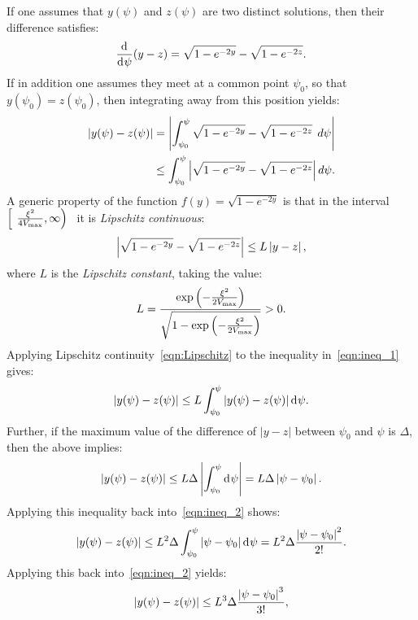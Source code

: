 If one assumes that $y(\psi)$ and $z(\psi)$ are two distinct solutions, then their difference satisfies:
%
\begin{equation}
  \frac{\operatorname{d}^{}\!{}}{\operatorname{d}^{}\!{\psi}}(y-z)
  =
  \sqrt{1-e^{-2y}} - \sqrt{1-e^{-2z}}.
  \label{eqn:master_diff}
\end{equation}
%
If in addition one assumes they meet at a common point $\psi_0$, so that $y(\psi_0)=z(\psi_0)$, then integrating away from this position yields:
%
\begin{align}
  \left|y(\psi)-z(\psi)\right|
  &=
  \left|\int_{\psi_0}^\psi \sqrt{1-e^{-2y}}
  - \sqrt{1-e^{-2z}}\:\:d\psi\right|
  \nonumber\\
  &
  \le \int_{\psi_0}^\psi \left|\sqrt{1-e^{-2y}}
  - \sqrt{1-e^{-2z}}\right|d\psi.
  \label{eqn:ineq_1}
\end{align}
%
A generic property of the function $f(y)=\sqrt{1-e^{-2y}}$ is that in the interval $\left[\phantom(\frac{\vellim^2}{4\Vm},\infty\right)\phantom]$ it is {\em Lipschitz continuous\/}:
%
\begin{equation}
  \left|\sqrt{1-e^{-2y}} - \sqrt{1-e^{-2z}}\right| \le L\left|y-z\right|,
  \label{eqn:Lipschitz}
\end{equation}
%
where $L$ is the {\em Lipschitz constant}, taking the value:
%
\begin{equation}
  L
  = 
  \frac{\exp{\left(-\frac{\xi^2}{2V_\mathrm{max}}\right)}}
  {\sqrt{1-\exp{\left(-\frac{\xi^2}{2V_\mathrm{max}}\right)}}} 
  > 0.
\end{equation}
%                                              
Applying Lipschitz continuity~\eqref{eqn:Lipschitz} to the inequality in~\eqref{eqn:ineq_1} gives:
%
\begin{equation}
  \left|y(\psi)-z(\psi)\right| 
  \le
  L\int_{\psi_0}^\psi\left|y(\psi)-z(\psi)\right|\operatorname{d}^{}\!{\psi}.
  \label{eqn:ineq_2}
\end{equation}
%
Further, if the maximum value of the difference of $|y-z|$ between $\psi_0$ and $\psi$ is $\Delta$, then the above implies:
%
\begin{equation}
  \left|y(\psi)-z(\psi)\right| 
  \le
  L\Delta\left|\int_{\psi_0}^\psi \operatorname{d}^{}\!{\psi}\right|= 
  L\Delta\left|\psi-\psi_0\right|.
\end{equation}
%
Applying this inequality back into~\eqref{eqn:ineq_2} shows:
%
\begin{equation}
  \left|y(\psi)-z(\psi)\right| 
  \le
  L^2\Delta\int_{\psi_0}^\psi\left|\psi-\psi_0\right|\operatorname{d}^{}\!{\psi} =
  L^2\Delta\frac{\left|\psi-\psi_0\right|^2}{2!}.
\end{equation}
%
Applying this back into~\eqref{eqn:ineq_2} yields:
%
\begin{equation}
  \left|y(\psi)-z(\psi)\right| 
  \le
  L^3\Delta\frac{\left|\psi-\psi_0\right|^3}{3!},
\end{equation}
